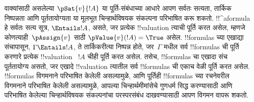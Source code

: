 \documentclass[../../../include/open-logic-section]{subfiles}
\begin{document}
वाक्यांसाठी असलेल्या $\pSat{v}{!A}$ या पूर्ति-संबंधाच्या आधारे
आपण सर्वतः सत्यता, तार्किक निष्पन्नता आणि पूर्ततायोग्यता या मूलभूत
चिन्हार्थविषयक संकल्पना परिभाषित करू शकतो. !!^a{formula} हे सर्वतः
सत्य सूत्र, $\Entails !A$, असते, जर प्रत्येक !!{valuation} त्याची
पूर्ति करत असेल, म्हणजे कोणत्याही~$\pAssign{v}$ साठी
$\pValue{v}(!A) = \True$ असेल. !!{formula}s च्या एखाद्या संचापासून,
$\Gamma \Entails !A$, ते तार्किकरीत्या निष्पन्न होते, जर~$\Gamma$
मधील सर्व !!{formula}s ची पूर्ति करणारे प्रत्येक !!{valuation}
~$!A$ चीही पूर्ति करत असेल. तसेच, !!{formula}s चा एखादा संच
पूर्ततायोग्य असतो, जर एखादे !!{valuation} त्यातील सर्व !!{formula}s
ची एकाच वेळी पूर्ति करत असेल. !!{formula}s विगमनाने
परिभाषित केलेली असल्यामुळे, आणि पूर्तिही !!{formula}s च्या रचनेवरील
विगमनाने परिभाषित केलेली असल्यामुळे, आपल्या चिन्हार्थमीमांसेचे
गुणधर्म सिद्ध करण्यासाठी आणि परिभाषित केलेल्या चिन्हार्थविषयक
संकल्पनांचा परस्परसंबंध दाखवण्यासाठी आपण विगमन वापरू शकतो.
\end{document}
